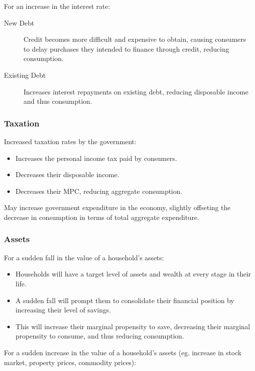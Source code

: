 \documentclass[a4paper,11pt]{article}
\begin{document}
For an increase in the interest rate:

\begin{description}
\item [New Debt] Credit becomes more difficult and expensive to obtain, causing
	consumers to delay purchases they intended to finance through credit,
	reducing consumption.
\item [Existing Debt] Increases interest repayments on existing debt, reducing
	disposable income and thus consumption.
\end{description}


\subsubsection{Taxation}

Increased taxation rates by the government:

\begin{itemize}
\item Increases the personal income tax paid by consumers.
\item Decreases their disposable income.
\item Decreases their MPC, reducing aggregate consumption.
\end{itemize}

May increase government expenditure in the economy, slightly offseting the
decrease in consumption in terms of total aggregate expenditure.


\subsubsection{Assets}

For a sudden fall in the value of a household's assets:

\begin{itemize}
\item Households will have a target level of assets and wealth at every stage
	in their life.
\item A sudden fall will prompt them to consolidate their financial position by
	increasing their level of savings.
\item This will increase their marginal propensity to save, decreasing their
	marginal propensity to consume, and thus reducing consumption.
\end{itemize}

For a sudden increase in the value of a household's assets (eg. increase in
stock market, property prices, commodity prices):
\end{document}
